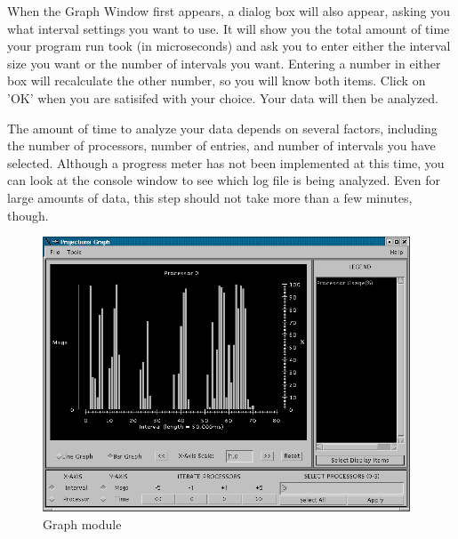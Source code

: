 \documentclass[10pt]{article}
\begin{document}
When the Graph Window first appears, a dialog box will also appear,
asking you what interval settings you want to use.  It will show you
the total amount of time your program run took (in microseconds) and
ask you to enter either the interval size you want or the number of
intervals you want.  Entering a number in either box will recalculate
the other number, so you will know both items. Click on 'OK' when you
are satisifed with your choice.  Your data will then be analyzed.

The amount of time to analyze your data depends on several factors,
including the number of processors, number of entries, and number of
intervals you have selected.  Although a progress meter has not been
implemented at this time, you can look at the console window to see
which log file is being analyzed.  Even for large amounts of data,
this step should not take more than a few minutes, though.

\begin{figure}[hbt]
\center
\includegraphics[width=4.3in]{fig/graph}
\caption{Graph module}
\label{graph}
\end{figure}
\end{document}
